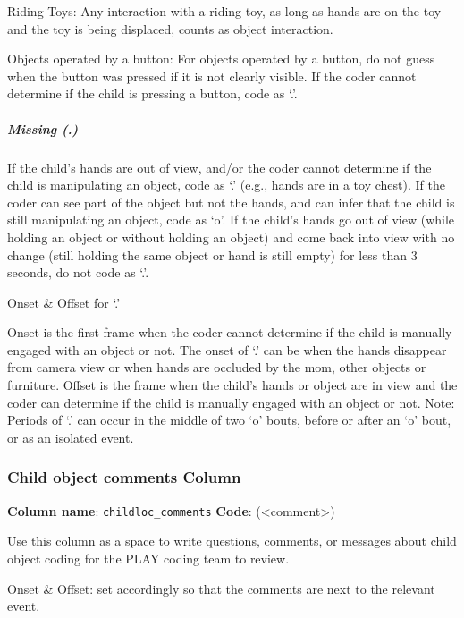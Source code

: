 \documentclass[
]{book}
\begin{document}
Riding Toys: Any interaction with a riding toy, as long as hands are on the toy and the toy is being displaced, counts as object interaction.

Objects operated by a button: For objects operated by a button, do not guess when the button was pressed if it is not clearly visible. If the coder cannot determine if the child is pressing a button, code as `.'.

\hypertarget{child_hands_off_camera}{%
\subparagraph*{Missing (.)}\label{child_hands_off_camera}}

If the child's hands are out of view, and/or the coder cannot determine if the child is manipulating an object, code as `.' (e.g., hands are in a toy chest). If the coder can see part of the object but not the hands, and can infer that the child is still manipulating an object, code as `o'.
If the child's hands go out of view (while holding an object or without holding an object) and come back into view with no change (still holding the same object or hand is still empty) for less than 3 seconds, do not code as `.'.

Onset \& Offset for `.'

Onset is the first frame when the coder cannot determine if the child is manually engaged with an object or not. The onset of `.' can be when the hands disappear from camera view or when hands are occluded by the mom, other objects or furniture.
Offset is the frame when the child's hands or object are in view and the coder can determine if the child is manually engaged with an object or not.
Note: Periods of `.' can occur in the middle of two `o' bouts, before or after an `o' bout, or as an isolated event.

\hypertarget{child-object-comments-column}{%
\subsubsection*{Child object comments Column}\label{child-object-comments-column}}

\textbf{Column name}: \texttt{childloc\_comments}
\textbf{Code}: (\textless comment\textgreater)

Use this column as a space to write questions, comments, or messages about child object coding for the PLAY coding team to review.

Onset \& Offset: set accordingly so that the comments are next to the relevant event.
\end{document}
